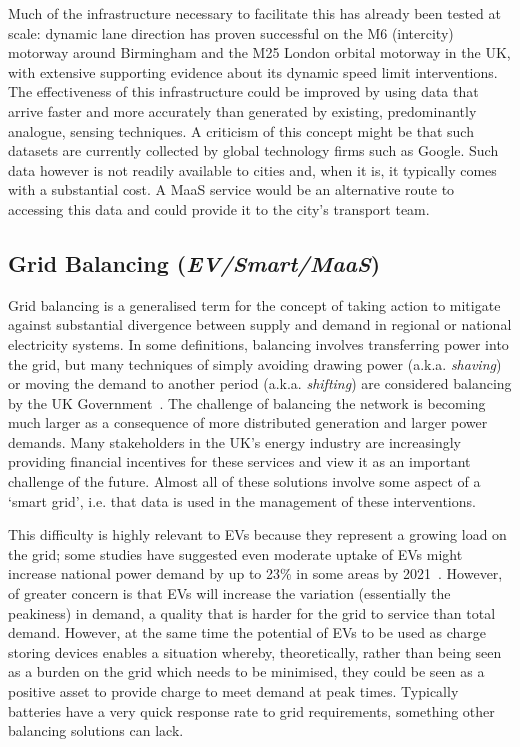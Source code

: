 \documentclass[b5paper,10pt]{article}
\begin{document}
Much of the infrastructure necessary to facilitate this has already
been tested at scale: dynamic lane direction has proven successful on
the M6 (intercity) motorway around Birmingham and the M25 London
orbital motorway in the UK, with extensive supporting evidence about
its dynamic speed limit interventions. The effectiveness of this
infrastructure could be improved by using data that arrive faster and
more accurately than generated by existing, predominantly analogue,
sensing techniques.  A criticism of this concept might be that such
datasets are currently collected by global technology firms such as
Google. Such data however is not readily available to cities and, when
it is, it typically comes with a substantial cost. A MaaS service
would be an alternative route to accessing this data and could provide
it to the city's transport team.

\subsection{Grid Balancing ({\emph{EV/Smart/MaaS}})} 

Grid balancing is a generalised term for the concept of taking action
to mitigate against substantial divergence between supply and demand
in regional or national electricity systems. In some definitions,
balancing involves transferring power into the grid, but many
techniques of simply avoiding drawing power (a.k.a. {\emph{shaving}})
or moving the demand to another period (a.k.a. {\emph{shifting}}) are
considered balancing by the UK Government~\citep{decc:2014}. The
challenge of balancing the network is becoming much larger as a
consequence of more distributed generation and larger power
demands. Many stakeholders in the UK's energy industry are
increasingly providing financial incentives for these services and
view it as an important challenge of the future. Almost all of these
solutions involve some aspect of a `smart grid', i.e. that data is
used in the management of these interventions.

This difficulty is highly relevant to EVs because they represent a
growing load on the grid; some studies have suggested even moderate
uptake of EVs might increase national power demand by up to 23\% in
some areas by 2021~\citep{paffumi-et-al:2015}. However, of greater
concern is that EVs will increase the variation
(essentially the peakiness) in demand, a quality that is harder for
the grid to service than total demand. However, at the same time the
potential of EVs to be used as charge storing devices enables a
situation whereby, theoretically, rather than being seen as a burden
on the grid which needs to be minimised, they could be seen as a
positive asset to provide charge to meet demand at peak
times. Typically batteries have a very quick response rate to grid
requirements, something other balancing solutions can lack.
\end{document}
